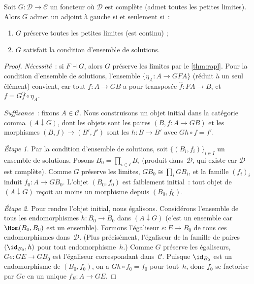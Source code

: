 \begin{theoreme}\label{thm:gaft}
Soit $G\colon\mathcal{D}\to\mathcal{C}$ un foncteur où $\mathcal{D}$
est complète (admet toutes les petites limites).
Alors $G$ admet un adjoint à gauche si et seulement si~:
\begin{enumerate}[label=(\roman*)]
\item $G$ préserve toutes les petites limites (est continu) ;
\item $G$ satisfait la condition d'ensemble de solutions.
\end{enumerate}
\end{theoreme}

\begin{proof}
\emph{Nécessité}~: si $F\dashv G$, alors $G$ préserve les limites par
le \autoref{thm:rapl}. Pour la condition d'ensemble de solutions,
l'ensemble $\{\eta_A\colon A\to GFA\}$ (réduit à un seul élément)
convient, car tout $f\colon A\to GB$ a pour transposée $\hat{f}\colon FA\to B$,
et $f = G\hat{f}\circ\eta_A$.

\emph{Suffisance}~: fixons $A\in\mathcal{C}$.
Nous construisons un objet initial dans la catégorie comma $(A\downarrow G)$,
dont les objets sont les paires $(B,f\colon A\to GB)$ et les morphismes
$(B,f)\to(B',f')$ sont les $h\colon B\to B'$ avec $Gh\circ f = f'$.

\emph{Étape 1.} Par la condition d'ensemble de solutions, soit
$\{(B_i,f_i)\}_{i\in I}$ un ensemble de solutions.
Posons $B_0 = \prod_{i\in I}B_i$ (produit dans~$\mathcal{D}$,
qui existe car $\mathcal{D}$ est complète).
Comme $G$ préserve les limites, $GB_0\cong\prod_i GB_i$,
et la famille $(f_i)_i$ induit $f_0\colon A\to GB_0$.
L'objet $(B_0,f_0)$ est \og{}faiblement initial\fg{}~: tout objet
de $(A\downarrow G)$ reçoit au moins un morphisme depuis $(B_0,f_0)$.

\emph{Étape 2.} Pour rendre l'objet initial, nous égalisons.
Considérons l'ensemble de tous les endomorphismes
$h\colon B_0\to B_0$ dans $(A\downarrow G)$
(c'est un ensemble car $\Hom(B_0,B_0)$ est un ensemble).
Formons l'égaliseur $e\colon E\to B_0$ de tous ces endomorphismes
dans~$\mathcal{D}$.
(Plus précisément, l'égaliseur de la famille de paires
$(\id_{B_0}, h)$ pour tout endomorphisme~$h$.)
Comme $G$ préserve les égaliseurs, $Ge\colon GE\to GB_0$ est
l'égaliseur correspondant dans~$\mathcal{C}$.
Puisque $\id_{B_0}$ est un endomorphisme de $(B_0,f_0)$,
on a $Gh\circ f_0 = f_0$ pour tout~$h$, donc
$f_0$ se factorise par $Ge$ en un unique $f_E\colon A\to GE$.


\end{proof}
